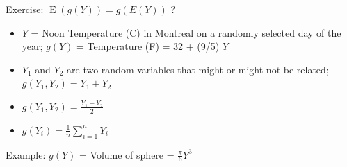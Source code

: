 \documentclass[10pt,handout]{beamer}\usepackage[]{graphicx}\usepackage[]{color}
\newcommand{\Expec}{\operatorname{E}}
\begin{document}
\begin{frame}{Exercise: $\Expec(g(Y)) = g(E(Y))$ ?}
	
	\begin{itemize}
		\setlength{\itemsep}{10pt}		
		\item $Y$ = Noon Temperature (C) in Montreal on a randomly selected day of the year;  
		$g(Y)$ = Temperature (F) = 32 + (9/5) $Y$
		\item  $Y_1$ and $Y_2$ are two random variables that might or might not be related; $g(Y_1, Y_2) = Y_1 + Y_2$ 
		\item  $g(Y_1, Y_2) = \frac{Y_1 + Y_2}{2}$  
		\item $g(Y_i) = \frac{1}{n} \sum_{i=1}^{n} Y_i$
	\end{itemize}
	
\end{frame}


\begin{frame}{Example: $g(Y)$ = Volume of sphere = $\frac{\pi}{6}  Y^3$}
	
\end{frame}
\end{document}
